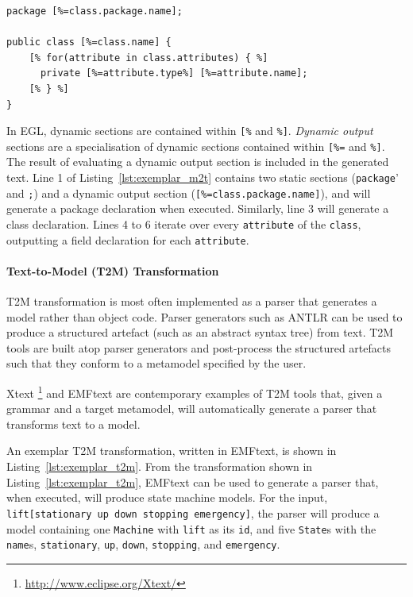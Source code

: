\begin{lstlisting}[caption=Exemplar M2T transformation in the Epsilon Generation Language, label=lst:exemplar_m2t, language=EGL]
package [%=class.package.name];

public class [%=class.name] {
	[% for(attribute in class.attributes) { %]
	  private [%=attribute.type%] [%=attribute.name];
	[% } %]
}
\end{lstlisting}

In EGL, dynamic sections are contained within \texttt{[\%} and \texttt{\%]}. \emph{Dynamic output} sections are a specialisation of dynamic sections contained within \texttt{[\%=} and \texttt{\%]}. The result of evaluating a dynamic output section is included in the generated text. Line 1 of Listing~\ref{lst:exemplar_m2t} contains two static sections (\texttt{package}' and \texttt{;}) and a dynamic output section (\texttt{[\%=class.package.name]}), and will generate a package declaration when executed.  Similarly, line 3 will generate a class declaration. Lines 4 to 6 iterate over every \texttt{attribute} of the \texttt{class}, outputting a field declaration for each \texttt{attribute}.


\paragraph{Text-to-Model (T2M) Transformation} T2M transformation is most often implemented as a parser that generates a model rather than object code. Parser generators such as ANTLR \cite{parr07antlr} can be used to produce a structured artefact (such as an abstract syntax tree) from text. T2M tools are built atop parser generators and post-process the structured artefacts such that they conform to a metamodel specified by the user.

Xtext \footnote{\url{http://www.eclipse.org/Xtext/}} and EMFtext \cite{heidenreich09derivation} are contemporary examples of T2M tools that, given a grammar and a target metamodel, will automatically generate a parser that transforms text to a model.

An exemplar T2M transformation, written in EMFtext, is shown in Listing~\ref{lst:exemplar_t2m}. From the transformation shown in Listing~\ref{lst:exemplar_t2m}, EMFtext can be used to generate a parser that, when executed, will produce state machine models. For the input, \texttt{lift[stationary up down stopping emergency]}, the parser will produce a model containing one \texttt{Machine} with \texttt{lift} as its \texttt{id}, and five \texttt{State}s with the \texttt{name}s, \texttt{stationary}, \texttt{up}, \texttt{down}, \texttt{stopping}, and \texttt{emergency}.

